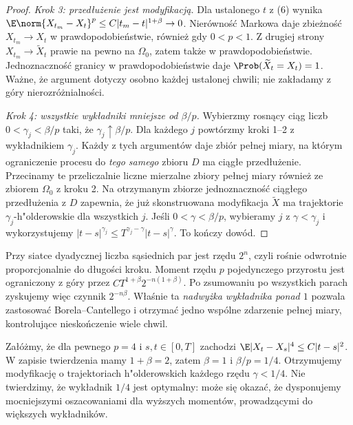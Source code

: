 \begin{proof}
\emph{Krok 3: przedłużenie jest modyfikacją.}
Dla ustalonego $t$ z (6) wynika
$\E\norm{X_{t_m}-X_t}^{p}\le C|t_m-t|^{1+\beta}\to0$.
Nierówność Markowa daje zbieżność $X_{t_m}\to X_t$
w prawdopodobieństwie, również gdy $0<p<1$.
Z drugiej strony $X_{t_m}\to\widetilde X_t$
prawie na pewno na $\Omega_0$, zatem także w
prawdopodobieństwie. Jednoznaczność granicy w
prawdopodobieństwie daje $\Prob(\widetilde X_t=X_t)=1$.
Ważne, że argument dotyczy osobno każdej ustalonej chwili;
nie zakładamy z góry nierozróżnialności.

\emph{Krok 4: wszystkie wykładniki mniejsze od $\beta/p$.}
Wybierzmy rosnący ciąg liczb
$0<\gamma_j<\beta/p$ taki, że
$\gamma_j\uparrow\beta/p$. Dla każdego $j$
powtórzmy kroki 1--2 z wykładnikiem $\gamma_j$.
Każdy z tych argumentów daje zbiór pełnej miary,
na którym ograniczenie procesu do \emph{tego samego}
zbioru $D$ ma ciągłe przedłużenie.
Przecinamy te przeliczalnie liczne mierzalne zbiory
pełnej miary również ze zbiorem $\Omega_0$ z kroku 2.
Na otrzymanym zbiorze jednoznaczność ciągłego
przedłużenia z $D$ zapewnia, że już skonstruowana
modyfikacja $\widetilde X$ ma trajektorie
$\gamma_j$-h"olderowskie dla wszystkich $j$.
Jeśli $0<\gamma<\beta/p$, wybieramy $j$ z
$\gamma<\gamma_j$ i wykorzystujemy
$|t-s|^{\gamma_j}\le T^{\gamma_j-\gamma}|t-s|^\gamma$.
To kończy dowód.
\end{proof}

\begin{uwaga}
Przy siatce dyadycznej liczba sąsiednich par jest rzędu
$2^n$, czyli rośnie odwrotnie proporcjonalnie do długości
kroku. Moment rzędu $p$ pojedynczego przyrostu jest
ograniczony z góry przez $CT^{1+\beta}2^{-n(1+\beta)}$. Po zsumowaniu po wszystkich parach
zyskujemy więc czynnik $2^{-n\beta}$.
Właśnie ta \emph{nadwyżka wykładnika ponad $1$}
pozwala zastosować Borela--Cantellego i otrzymać
jedno wspólne zdarzenie pełnej miary, kontrolujące
nieskończenie wiele chwil.
\end{uwaga}

\begin{przyklad}
Załóżmy, że dla pewnego $p=4$ i $s,t\in[0,T]$
zachodzi $\E|X_t-X_s|^4\le C|t-s|^2$.
W zapisie twierdzenia mamy $1+\beta=2$, zatem $\beta=1$
i $\beta/p=1/4$. Otrzymujemy modyfikację o trajektoriach
h"olderowskich każdego rzędu $\gamma<1/4$.
Nie twierdzimy, że wykładnik $1/4$ jest optymalny:
może się okazać, że dysponujemy mocniejszymi
oszacowaniami dla wyższych momentów, prowadzącymi do
większych wykładników.
\end{przyklad}

